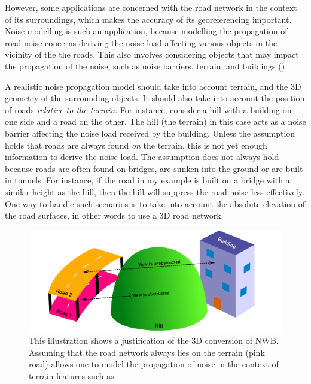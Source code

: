 However, some applications are concerned with the road network in the context of its surroundings, which makes the accuracy of its georeferencing important. Noise modelling is such an application, because modelling the propagation of road noise concerns deriving the noise load affecting various objects in the vicinity of the the roads. This also involves considering objects that may impact the propagation of the noise, such as noise barriers, terrain, and buildings (\cite{ishiyama_etal_1991, bennett_1997, guarnaccia_quartieri_2012}).

A realistic noise propagation model should take into account terrain, and the 3D geometry of the surrounding objects. It should also take into account the position of roads \textit{relative to the terrain}. For instance, consider a hill with a building on one side and a road on the other. The hill (the terrain) in this case acts as a noise barrier affecting the noise load received by the building. Unless the assumption holds that roads are always found \textit{on} the terrain, this is not yet enough information to derive the noise load. The assumption does not always hold because roads are often found on bridges, are sunken into the ground or are built in tunnels. For instance, if the road in my example is built on a bridge with a similar height as the hill, then the hill will suppress the road noise less effectively. One way to handle such scenarios is to take into account the absolute elevation of the road surfaces, in other words to use a 3D road network.

\begin{figure}
    \centering
    \includegraphics[width=\linewidth]{final_report/figs/justification_illu.pdf}
    \caption[Illustration of the 3D conversion justification]{This illustration shows a justification of the 3D conversion of NWB. Assuming that the road network always lies on the terrain (pink road) allows one to model the propagation of noise in the context of terrain features such as }
    \label{fig:justification_illu}
\end{figure}

